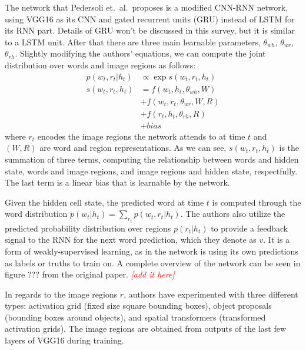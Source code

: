\documentclass[10pt,twocolumn,letterpaper]{article}
\newcommand{\todo}[1]{\textcolor{red}{{\em [#1]}} }
\begin{document}
The network that Pedersoli et.\ al.\ proposes is a modified CNN-RNN network,
using VGG16 as its CNN and gated recurrent units (GRU) instead of LSTM for its
RNN part. Details of GRU won't be discussed in this survey, but it is similar
to a LSTM unit. After that there are three main learnable parameters,
$\theta_{wh}$, $\theta_{wr}$, $\theta_{rh}$. Slightly modifying the authors'
equations, we can compute the joint distribution over words and image regions
as follows:
%
\begin{equation}
  \begin{aligned}
    p(w_t, r_t|h_t) &\propto \exp s(w_t, r_t, h_t) \\
    s(w_t, r_t, h_t) &= f(w_t, h_t, \theta_{wh}, W) \\
                     &+ f(w_t, r_t, \theta_{wr}, W, R) \\
                     &+ f(r_t, h_t, \theta_{rh}, R) \\
                     &+ bias
  \end{aligned}
\end{equation}
%
where $r_t$ encodes the image regions the network attends to at time $t$ and
$(W,R)$ are word and region representations. As we can see, $s(w_t, r_t, h_t)$
is the summation of three terms, computing the relationship between words and
hidden state, words and image regions, and image regions and hidden state,
respectfully. The last term is a linear bias that is learnable by the network.

Given the hidden cell state, the predicted word at time $t$ is computed
through the word distribution $p(w_t|h_t) = \sum_{r_t} p(w_t,r_t|h_t)$. The
authors also utilize the predicted probability distribution over regions
$p(r_t|h_t)$ to provide a feedback signal to the RNN for the next word
prediction, which they denote as $v$. It is a form of weakly-supervised
learning, as in the network is using its own predictions as labels or truths
to train on. A complete overview of the network can be seen in figure ??? from
the original paper. \todo{add it here}

In regards to the image regions $r$, authors have experimented with three
different types: activation grid (fixed size square bounding boxes), object
proposals (bounding boxes around objects), and spatial transformers
(transformed activation grids). The image regions are obtained from outputs of
the last few layers of VGG16 during training.
\end{document}
